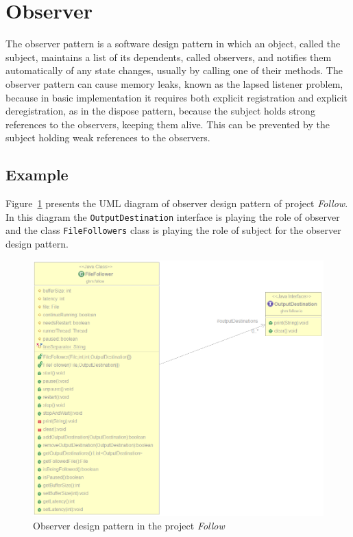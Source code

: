 \section{Observer}

The observer pattern is a software design pattern in which an object, called the subject, maintains a list of its dependents, called observers, and notifies them automatically of any state changes, usually by calling one of their methods. The observer pattern can cause memory leaks, known as the lapsed listener problem, because in basic implementation it requires both explicit registration and explicit deregistration, as in the dispose pattern, because the subject holds strong references to the observers, keeping them alive. This can be prevented by the subject holding weak references to the observers.

\subsection*{Example}

Figure~\ref{fig:Observer} presents the UML diagram of observer design pattern of project \textit{Follow}. In this diagram the \texttt{OutputDestination} interface is playing the role of observer and the class \texttt{FileFollowers} class is playing the role of subject for the observer design pattern.      

\begin{figure}[htb]
    \centering
    \includegraphics[width=\columnwidth]{images/Observer.png}
    \caption{Observer design pattern in the project \textit{Follow}}
    \label{fig:Observer}
\end{figure}
\FloatBarrier

